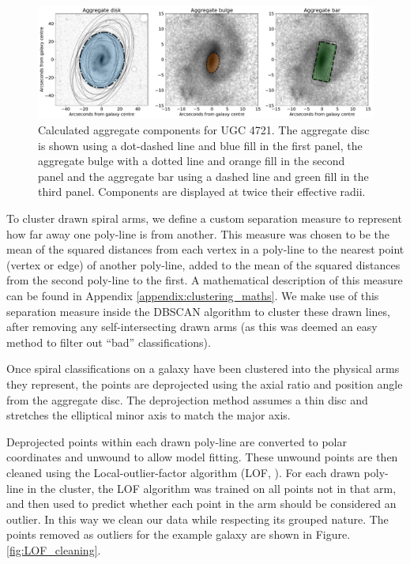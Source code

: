 \documentclass[../main.tex]{subfiles}
\begin{document}
\begin{figure}
  \includegraphics[width=17.3cm]{images__method/mean_shapes.pdf}
  \caption{Calculated aggregate components for UGC 4721. The aggregate disc is shown using a dot-dashed line and blue fill in the first panel, the aggregate bulge with a dotted line and orange fill in the second panel and the aggregate bar using a dashed line and green fill in the third panel. Components are displayed at twice their effective radii.}
  \label{fig:mean_shapes}
\end{figure}

To cluster drawn spiral arms, we define a custom separation measure to represent how far away one poly-line is from another. This measure was chosen to be the mean of the squared distances from each vertex in a poly-line to the nearest point (vertex or edge) of another poly-line, added to the mean of the squared distances from the second poly-line to the first. A mathematical description of this measure can be found in Appendix \ref{appendix:clustering_maths}. We make use of this separation measure inside the DBSCAN algorithm to cluster these drawn lines, after removing any self-intersecting drawn arms (as this was deemed an easy method to filter out ``bad'' classifications).

Once spiral classifications on a galaxy have been clustered into the physical arms they represent, the points are deprojected using the axial ratio and position angle from the aggregate disc. The deprojection method assumes a thin disc and stretches the elliptical minor axis to match the major axis.

Deprojected points within each drawn poly-line are converted to polar coordinates and unwound to allow model fitting. These unwound points are then cleaned using the Local-outlier-factor algorithm (LOF, \citealt{local-outlier-factor}). For each drawn poly-line in the cluster, the LOF algorithm was trained on all points not in that arm, and then used to predict whether each point in the arm should be considered an outlier. In this way we clean our data while respecting its grouped nature. The points removed as outliers for the example galaxy are shown in Figure. \ref{fig:LOF_cleaning}.
\end{document}
